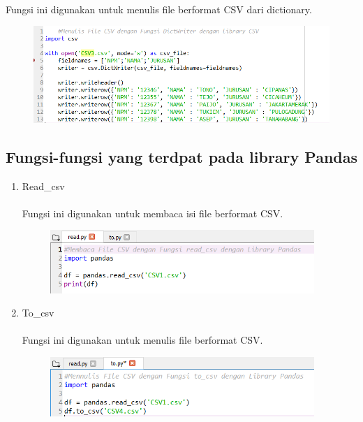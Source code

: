 \documentclass[a4paper, 12pt]{article}
\begin{document}
\begin{enumerate}
\paragraph{}  Fungsi ini digunakan untuk menulis file berformat CSV dari dictionary.
\begin{figure}[ht]
\centerline{\includegraphics[width=15cm]{figure/4.PNG}}
\end{figure}
\end{enumerate}

\subsection{Fungsi-fungsi yang terdpat pada library Pandas}
\begin{enumerate}
\item Read\_csv
\paragraph{} Fungsi ini digunakan untuk membaca isi file berformat CSV.
\begin{figure}[ht]
\centerline{\includegraphics[width=10cm]{figure/5.PNG}}
\end{figure}
\item To\_csv
\paragraph{} Fungsi ini digunakan untuk menulis file berformat CSV.
\begin{figure}[ht]
\centerline{\includegraphics[width=10cm]{figure/6.PNG}}
\end{figure}
\end{enumerate}
\end{document}
